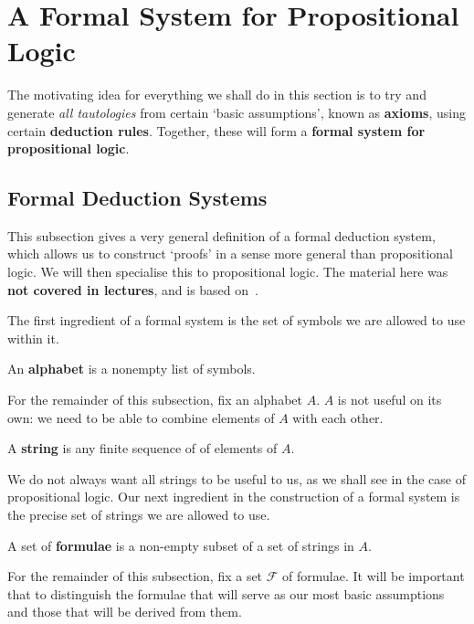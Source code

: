 \section{A Formal System for Propositional Logic}\label{Ch1:Sec:1_2}

The motivating idea for everything we shall do in this section is to try and generate \textit{all tautologies} from certain `basic assumptions', known as \textbf{axioms}, using certain \textbf{deduction rules}. Together, these will form a \textbf{formal system for propositional logic}.

\subsection{Formal Deduction Systems}

This subsection gives a very general definition of a formal deduction system, which allows us to construct `proofs' in a sense more general than propositional logic. We will then specialise this to propositional logic. The material here was \textbf{not covered in lectures}, and is based on~\cite[Definition 1.2.1]{LecNotes2018}.

The first ingredient of a formal system is the set of symbols we are allowed to use within it.

\begin{boxdefinition}[Alphabet]
    An \textbf{alphabet} is a nonempty list of symbols.
\end{boxdefinition}

For the remainder of this subsection, fix an alphabet $A$. $A$ is not useful on its own: we need to be able to combine elements of $A$ with each other.

\begin{boxdefinition}[Strings]
    A \textbf{string} is any finite sequence of of elements of $A$.
\end{boxdefinition}

We do not always want all strings to be useful to us, as we shall see in the case of propositional logic. Our next ingredient in the construction of a formal system is the precise set of strings we are allowed to use.

\begin{boxdefinition}[Formulae]
    A set of \textbf{formulae} is a non-empty subset of a set of strings in $A$.
\end{boxdefinition}

For the remainder of this subsection, fix a set $\mathcal{F}$ of formulae. It will be important that to distinguish the formulae that will serve as our most basic assumptions and those that will be derived from them.

